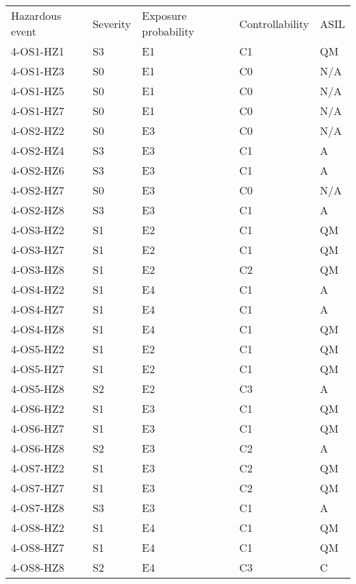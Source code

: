 \begin{center}
\begin{tabular}{l|l|l|l|l}
Hazardous event	& Severity	& Exposure probability	& Controllability	& ASIL	\\
4-OS1-HZ1		& S3		& E1					& C1				& QM	\\
4-OS1-HZ3		& S0		& E1					& C0				& N/A	\\
4-OS1-HZ5		& S0		& E1					& C0				& N/A	\\
4-OS1-HZ7		& S0		& E1					& C0				& N/A	\\

4-OS2-HZ2		& S0		& E3					& C0				& N/A	\\
4-OS2-HZ4		& S3		& E3					& C1				& A	\\
4-OS2-HZ6		& S3		& E3					& C1				& A	\\
4-OS2-HZ7		& S0		& E3					& C0				& N/A	\\
4-OS2-HZ8		& S3		& E3					& C1				& A	\\

4-OS3-HZ2		& S1		& E2					& C1 				& QM	\\
4-OS3-HZ7		& S1		& E2					& C1				& QM	\\
4-OS3-HZ8		& S1		& E2					& C2				& QM	\\

4-OS4-HZ2		& S1		& E4					& C1				& A	\\
4-OS4-HZ7		& S1		& E4					& C1				& A	\\
4-OS4-HZ8		& S1		& E4					& C1				& QM	\\

4-OS5-HZ2		& S1		& E2					& C1 				& QM	\\
4-OS5-HZ7		& S1		& E2					& C1				& QM	\\
4-OS5-HZ8		& S2		& E2					& C3				& A	\\

4-OS6-HZ2		& S1		& E3					& C1				& QM	\\
4-OS6-HZ7		& S1		& E3					& C1				& QM	\\
4-OS6-HZ8		& S2		& E3					& C2				& A	\\

4-OS7-HZ2		& S1		& E3					& C2				& QM	\\
4-OS7-HZ7		& S1		& E3					& C2				& QM \\
4-OS7-HZ8		& S3		& E3					& C1				& A	\\

4-OS8-HZ2		& S1		& E4					& C1				& QM	\\
4-OS8-HZ7		& S1		& E4					& C1				& QM	\\
4-OS8-HZ8		& S2		& E4					& C3				& C	\\


\end{tabular}
\end{center}
